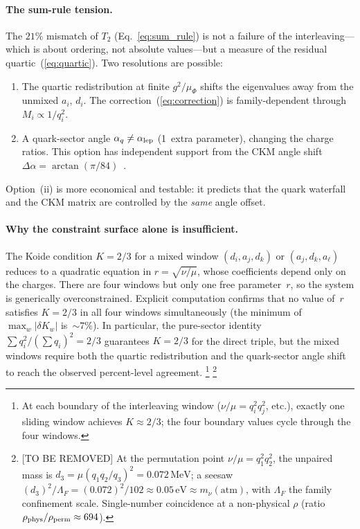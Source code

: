 \documentclass[preprint,12pt]{elsarticle}
\newcommand{\MeV}{\,\mathrm{MeV}}
\begin{document}
\paragraph{The sum-rule tension.}
The $21\%$ mismatch of $T_2$ (Eq.~\ref{eq:sum_rule})
is not a failure of the interleaving---which is
about ordering, not absolute values---but a measure of
the residual quartic~(\ref{eq:quartic}).
Two resolutions are possible:
\begin{enumerate}
\item The quartic redistribution at finite $g^2/\mu_\Phi$
  shifts the eigenvalues away from the unmixed $a_i$, $d_i$.
  The correction~(\ref{eq:correction}) is family-dependent
  through $M_i \propto 1/q_i^2$.
\item A quark-sector angle $\alpha_q \neq \alpha_{\rm lep}$
  (1~extra parameter), changing the charge ratios.
  This option has independent support from the CKM
  angle shift $\Delta\alpha = \arctan(\pi/84)$~\cite{letter_q2}.
\end{enumerate}
Option~(ii) is more economical and testable:
it predicts that the quark waterfall and the CKM matrix
are controlled by the \emph{same} angle offset.

\paragraph{Why the constraint surface alone is insufficient.}
The Koide condition $K = 2/3$ for a mixed window
$(d_i, a_j, d_k)$ or $(a_j, d_k, a_\ell)$ reduces to a
quadratic equation in $r = \sqrt{\nu/\mu}$, whose coefficients
depend only on the charges.  There are four windows but only
one free parameter~$r$, so the system is generically overconstrained.
Explicit computation confirms that no value of~$r$ satisfies
$K = 2/3$ in all four windows simultaneously
(the minimum of $\max_w |\delta K_w|$ is~$\sim\!7\%$).
In particular, the pure-sector identity $\sum q_i^2 / (\sum q_i)^2 = 2/3$
guarantees $K = 2/3$ for the direct triple, but the mixed windows require
both the quartic redistribution and the quark-sector angle shift to reach
the observed percent-level agreement.%
\footnote{At each boundary of the interleaving window
($\nu/\mu = q_i^2 q_j^2$, etc.), exactly one sliding window
achieves $K \approx 2/3$; the four boundary values cycle through
the four windows.}%
\footnote{[TO BE REMOVED] At the permutation point
$\nu/\mu = q_1^2 q_2^2$, the unpaired mass is
$d_3 = \mu(q_1 q_2/q_3)^2 = 0.072\MeV$; a seesaw
$(d_3)^2/\Lambda_F = (0.072)^2/102 \approx 0.05\,\mathrm{eV}
\approx m_\nu(\mathrm{atm})$, with $\Lambda_F$ the family
confinement scale.  Single-number coincidence at a non-physical
$\rho$ (ratio $\rho_{\rm phys}/\rho_{\rm perm} \approx 694$).}
\end{document}
